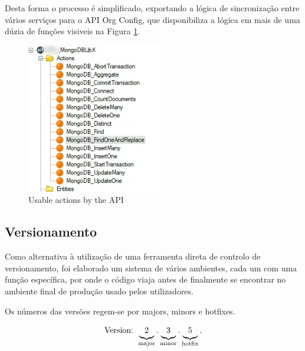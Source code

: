                 Desta forma o processo é simplificado, exportando a lógica de sincronização entre vários serviços para o API Org Config, que disponibiliza a lógica em mais de uma dúzia de funções visiveis na Figura \ref{fig:api-org-config}.

            \begin{figure}[htbp]
                \centering
                \includegraphics[scale=0.80]{imgs/API-Org-Config.png}
                \caption{Usable actions by the API}\label{fig:api-org-config}
            \end{figure}
        
        \subsection{Versionamento}\label{secsec:versionamento}

            Como alternativa à utilização de uma ferramenta direta de controlo de versionamento, foi elaborado um sistema de vários ambientes, cada um com uma função específica, por onde o código viaja antes de finalmente se encontrar no ambiente final de produção usado pelos utilizadores.
        
            Os números das versões regem-se por majors, minors e hotfixes.

            \[
                \text{Version: }
                  \underbrace{2\vphantom{(y)}}_\text{major} \text{.}
                  \underbrace{3\vphantom{(y)}}_\text{minor} \text{.}
                  \underbrace{5\vphantom{(y)}}_\text{hotfix} \text{.}
              \]


